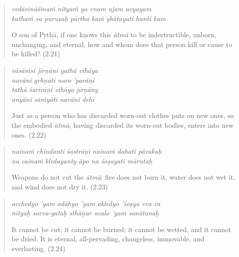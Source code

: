 \documentclass[12pt, twoside, openright]{memoir}
\begin{document}
\par
\begin{verse}
\textit{vedāvināśinaṁ nityaṁ ya enam ajam avyayam} \\
\textit{kathaṁ sa puruṣaḥ pārtha kaṁ ghātayati hanti kam}

\noindent O son of Pṛthā, if one knows this \textit{ātmā} to be indestructible, unborn, unchanging, and eternal, how and whom does that person kill or cause to be killed? (2.21)
\end{verse}
\par



\par
\begin{verse}
\textit{vāsāṁsi jīrṇāni yathā vihāya} \\
\textit{navāni gṛhṇāti naro ’parāṇi} \\
\textit{tathā śarīrāṇi vihāya jīrṇāny} \\
\textit{anyāni saṁyāti navāni dehī}

\noindent Just as a person who has discarded worn-out clothes puts on new ones, so the embodied \textit{ātmā}, having discarded its worn-out bodies, enters into new ones. (2.22)
\end{verse}
\par



\par
\begin{verse}
\textit{nainaṁ chindanti śastrāṇi nainaṁ dahati pāvakaḥ} \\
\textit{na cainaṁ kledayanty āpo na śoṣayati mārutaḥ}

\noindent Weapons do not cut the \textit{ātmā}; fire does not burn it, water does not wet it, and wind does not dry it. (2.23)
\end{verse}
\par



\par
\begin{verse}
\textit{acchedyo ’yam adāhyo ’yam akledyo ’śoṣya eva ca} \\
\textit{nityaḥ sarva-gataḥ sthāṇur acalo ’yaṁ sanātanaḥ}

\noindent It cannot be cut; it cannot be burned; it cannot be wetted, and it cannot be dried. It is eternal, all-pervading, changeless, immovable, and everlasting. (2.24)
\end{verse}
\par
\end{document}
